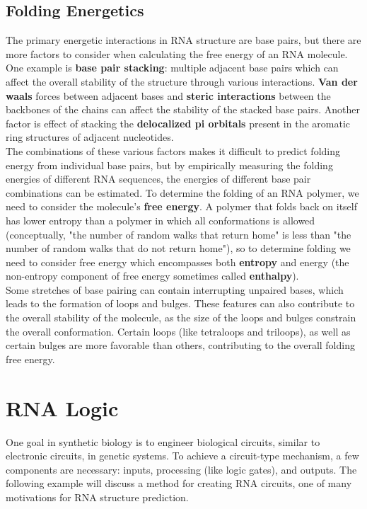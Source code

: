\documentclass[12pt]{article}
\begin{document}
\subsection{Folding Energetics}
The primary energetic interactions in RNA structure are base pairs, but there are more factors to consider when calculating the free energy of an RNA molecule. One example is {\bf base pair stacking}: multiple adjacent base pairs which can affect the overall stability of the structure through various interactions. {\bf Van der waals} forces between adjacent bases and \textbf{steric interactions} between the backbones of the chains can affect the stability of the stacked base pairs. Another factor is effect of stacking the \textbf{delocalized pi orbitals} present in the aromatic ring structures of adjacent nucleotides.\\[10pt]
The combinations of these various factors makes it difficult to predict folding energy from individual base pairs, but by empirically measuring the folding energies of different RNA sequences, the energies of different base pair combinations can be estimated. To determine the folding of an RNA polymer, we need to consider the molecule's \textbf{free energy}. A polymer that folds back on itself has lower entropy than a polymer in which all conformations is allowed (conceptually, "the number of random walks that return home" is less than "the number of random walks that do not return home"), so to determine folding we need to consider free energy which encompasses both \textbf{entropy} and energy (the non-entropy component of free energy sometimes called \textbf{enthalpy}).  \\[10pt]
Some stretches of base pairing can contain interrupting unpaired bases, which leads to the formation of loops and bulges. These features can also contribute to the overall stability of the molecule, as the size of the loops and bulges constrain the overall conformation. Certain loops (like tetraloops and triloops), as well as certain bulges are more favorable than others, contributing to the overall folding free energy.

\section{RNA Logic}
One goal in synthetic biology is to engineer biological circuits, similar to electronic circuits, in genetic systems. To achieve a circuit-type mechanism, a few components are necessary: inputs, processing (like logic gates), and outputs. The following example will discuss a method for creating RNA circuits, one of many motivations for RNA structure prediction.
\end{document}
